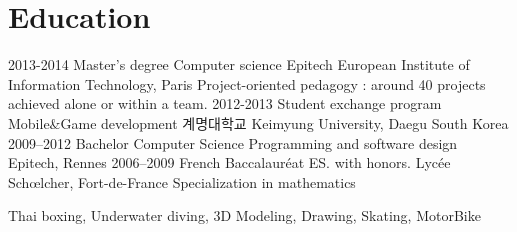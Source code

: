 \documentclass{emonides-cv}
\begin{document}
\section{Education}
\begin{entrylist}
  \entrytwo
    {2013-2014}
    {Master's degree {\normalfont Computer science }}
    {Epitech European Institute of Information Technology, Paris} {Project-oriented pedagogy : around 40 projects achieved alone or within a team.}
  \entrytwo
    {2012-2013}
    {Student exchange program  {\normalfont  Mobile\&Game development }}
    { {\sffamily 계명대학교} Keimyung University, Daegu South Korea} {}
  \entrytwo
    {2009–2012}
    {Bachelor  {\normalfont Computer Science Programming and software design}}
    {Epitech, Rennes} {}
  \entry
    {2006–2009}
    {French Baccalauréat ES. {\normalfont with honors. }}
    {Lycée Schœlcher, Fort-de-France} { Specialization in mathematics }
\end{entrylist}
\normalsize Thai boxing, Underwater diving, 3D Modeling, Drawing, Skating, MotorBike  
\end{document}
